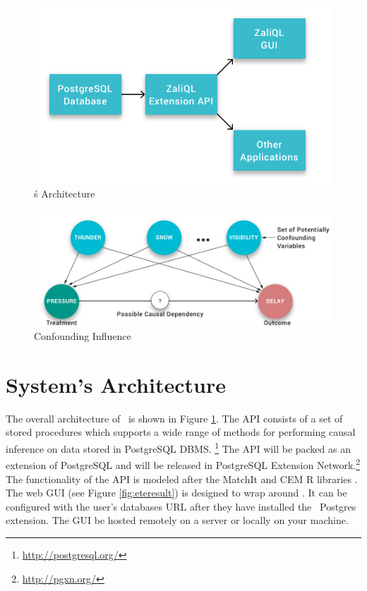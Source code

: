 
\begin{figure}
 \includegraphics[scale=0.25]{Figures/System-Overview.png}
 \caption{\GSQLB\'s Architecture}
  \label{fig:arch}
  \vspace{-3mm}
\end{figure}

\begin{figure}
\hspace*{.3cm}\includegraphics[scale=0.2]{figures/Scenario-Graph.png}
\caption{Confounding Influence }

\label{fig:cv}
\vspace{-0.3cm}
\end{figure}

\section{System's Architecture}

The overall architecture of \GSQL\ is shown in Figure \ref{fig:arch}.
The API consists of a set of stored procedures which supports a wide range of methods for performing causal inference on data stored in PostgreSQL DBMS. \footnote{\url{http://postgresql.org/}}
The API will be packed  as an extension of  PostgreSQL and will be released in 
PostgreSQL Extension Network.\footnote{\url{http://pgxn.org/}}
The functionality of the API is modeled after the MatchIt and CEM R libraries \cite{ho2005,iacus2009cem}. The web GUI (see Figure \ref{fig:eteresult}) is designed to wrap around \GSQL. It can be configured with the user's databases URL after they have installed the \GSQL\ Postgres extension. The  GUI be hosted remotely on a server or locally on your machine. 

